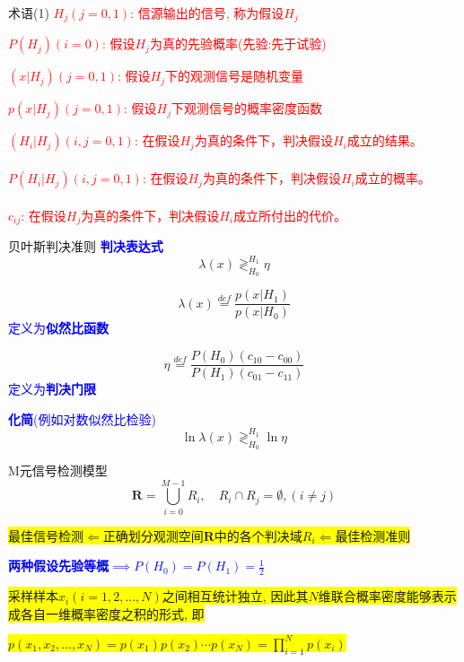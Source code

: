 \begin{frame}{术语(1)}
\textcolor{red}{$H_j(j=0,1)$: 信源输出的信号, 称为假设$H_j$}

\bigskip

\textcolor{red}{$P(H_j)(i=0)$: 假设$H_j$为真的先验概率(先验:先于试验)}


\bigskip
\textcolor{red}{$(x|H_j)(j=0,1)$: 假设$H_j$下的观测信号是随机变量}

\bigskip

\textcolor{red}{$p(x|H_j)(j=0,1)$: 假设$H_j$下观测信号的概率密度函数}

\bigskip

\textcolor{red}{$(H_i|H_j)(i,j=0,1)$: 在假设$H_j$为真的条件下，判决假设$H_i$成立的结果。}\\
~\\
\textcolor{red}{$P(H_i|H_j)(i,j=0,1)$: 在假设$H_j$为真的条件下，判决假设$H_i$成立的概率。}\\
~\\
\textcolor{red}{$c_{ij}$: 在假设$H_j$为真的条件下，判决假设$H_i$成立所付出的代价。}
 
\end{frame}


\begin{frame}{贝叶斯判决准则}
\textcolor{blue}{\textbf{判决表达式}}
\[
\lambda(x)\mathop{\gtrless}_{H_0}^{H_1}\eta
\]

\[ \lambda(x)\mathop{=}\limits^{def}\frac{p(x|H_1)}{p(x|H_0)} \] \textcolor{blue}{定义为\textbf{似然比函数}}

\bigskip
\[\eta\mathop{=}\limits^{def}\frac{P(H_0)(c_{10}-c_{00})}{P(H_1)(c_{01}-c_{11})} \] \textcolor{blue}{定义为\textbf{判决门限}}

\bigskip
\textcolor{blue}{\textbf{化简}(例如对数似然比检验)}
\[
\ln\lambda(x)\mathop{\gtrless}_{H_0}^{H_1}\ln\eta
\]

\end{frame}

\begin{frame}{M元信号检测模型}
\[\bm{R}=\bigcup\limits_{i=0}^{M-1}R_i, \quad R_i\cap R_j=\emptyset,(i\ne j) \]

\bigskip

\colorbox{yellow}{最佳信号检测$\Leftarrow$正确划分观测空间$\bm{R}$中的各个判决域$R_i\Leftarrow$最佳检测准则} 

\bigskip

\textcolor{blue}{\textbf{两种假设先验等概$\implies P(H_0)=P(H_1)=\frac{1}{2}$}}

\bigskip


\tiny{
\colorbox{yellow}{采样样本$x_i(i=1,2,\dots,N)$之间相互统计独立, 因此其$N$维联合概率密度能够表示成各自一维概率密度之积的形式, 即}\\
}

\colorbox{yellow}{$p(x_1,x_2,\dots,x_N)=p(x_1)p(x_2)\cdots p(x_N)=\prod\limits_{i=1}^Np(x_i)$} 
\end{frame}

